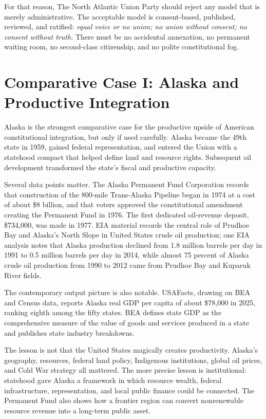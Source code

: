 \documentclass[11pt,a4paper]{article}
\newcommand{\PartyEN}{The North Atlantic Union Party}
\begin{document}
For that reason, \PartyEN{} should reject any model that is merely administrative. The acceptable model is consent-based, published, reviewed, and ratified: \textit{equal voice or no union; no union without consent; no consent without truth.} There must be no accidental annexation, no permanent waiting room, no second-class citizenship, and no polite constitutional fog.

\section{Comparative Case I: Alaska and Productive Integration}
Alaska is the strongest comparative case for the productive upside of American constitutional integration, but only if used carefully. Alaska became the 49th state in 1959, gained federal representation, and entered the Union with a statehood compact that helped define land and resource rights. Subsequent oil development transformed the state's fiscal and productive capacity.

Several data points matter. The Alaska Permanent Fund Corporation records that construction of the 800-mile Trans-Alaska Pipeline began in 1974 at a cost of about \$8 billion, and that voters approved the constitutional amendment creating the Permanent Fund in 1976. The first dedicated oil-revenue deposit, \$734,000, was made in 1977.\cite{apfchistory} EIA material records the central role of Prudhoe Bay and Alaska's North Slope in United States crude oil production; one EIA analysis notes that Alaska production declined from 1.8 million barrels per day in 1991 to 0.5 million barrels per day in 2014, while almost 75 percent of Alaska crude oil production from 1990 to 2012 came from Prudhoe Bay and Kuparuk River fields.\cite{eiaalaskaarctic}

The contemporary output picture is also notable. USAFacts, drawing on BEA and Census data, reports Alaska real GDP per capita of about \$78,000 in 2025, ranking eighth among the fifty states.\cite{usafactsalaska} BEA defines state GDP as the comprehensive measure of the value of goods and services produced in a state and publishes state industry breakdowns.\cite{beagdpstate}

The lesson is not that the United States magically creates productivity. Alaska's geography, resources, federal land policy, Indigenous institutions, global oil prices, and Cold War strategy all mattered. The more precise lesson is institutional: statehood gave Alaska a framework in which resource wealth, federal infrastructure, representation, and local public finance could be connected. The Permanent Fund also shows how a frontier region can convert nonrenewable resource revenue into a long-term public asset.
\end{document}
